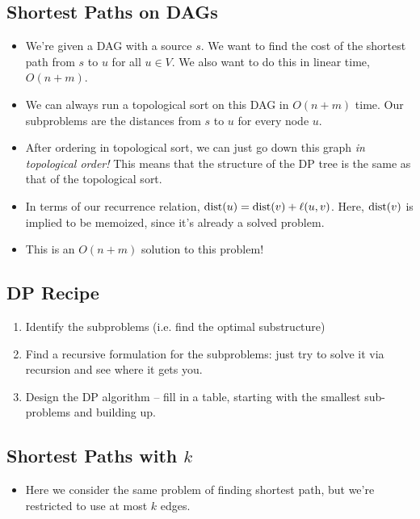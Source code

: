 	\subsection{Shortest Paths on DAGs}
	\begin{itemize}
		\item We're given a DAG with a source $s$. We want to find the cost of the shortest path from 
			$s$ to $u$ for all $u \in V$. We also want to do this in linear time, 
			$O(n + m)$.
		\item We can always run a topological sort on this DAG in $O(n + m)$ time. Our subproblems 
			are the distances from $s$ to $u$ for every node $u$.
		\item After ordering in topological sort, we can just go down this graph \textit{in topological 
			order!} This means that the structure of the DP tree is the same as that of the topological sort.
		\item In terms of our recurrence relation, $\mathrm{dist}(u) = \mathrm{dist}(v) + \ell(u, v)$. Here, 
			$\mathrm{dist}(v)$ is implied to be memoized, since it's already a solved problem.
		\item This is an $O(n +m)$ solution to this problem!
	\end{itemize}
	\subsection{DP Recipe}
	\begin{enumerate}[label=\alph*)]
		\item Identify the subproblems (i.e. find the optimal substructure)
		\item Find a recursive formulation for the subproblems: just try to solve it via recursion and 
			see where it gets you.
		\item Design the DP algorithm -- fill in a table, starting with the smallest sub-problems and 
			building up. 
	\end{enumerate}
	\subsection{Shortest Paths with $k$}
	\begin{itemize}
		\item Here we consider the same problem of finding shortest path, but we're restricted to use at most 
			$k$ edges. 

	\end{itemize}
